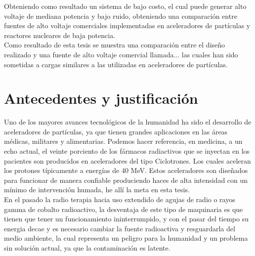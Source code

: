 Obteniendo como resultado un sistema de bajo costo, el cual puede generar alto voltaje de mediana potencia y bajo ruido, obteniendo una comparación entre fuentes de alto voltaje comerciales implementadas en aceleradores de partículas y reactores nucleares de baja potencia. \\

Como resultado de esta tesis se muestra una comparación entre el diseño realizado y una fuente de alto voltaje comercial llamada... las cuales han sido sometidas a cargas similares a las utilizadas en aceleradores de partículas.\newpage




\section{Antecedentes y justificación}


Uno de los mayores avances tecnológicos de la humanidad ha sido el desarrollo de aceleradores de partículas, ya que tienen grandes aplicaciones en las áreas médicas, militares y alimentarias. Podemos hacer referencia, en medicina, a un echo actual, el veinte porciento de los fármacos radiactivos que se inyectan en los pacientes son producidos en aceleradores del tipo Ciclotrones. Los cuales aceleran los protones típicamente a energías de 40 MeV. Estos aceleradores son diseñados para funcionar de manera confiable produciendo haces de alta intensidad con un mínimo de intervención humada, he allí la meta en esta tesis.\\

En el pasado la radio terapia hacia uso extendido de agujas de radio o rayos gamma de cobalto radioactivo, la desventaja de este tipo de maquinaria es que tienen que tener un funcionamiento ininterrumpido, y con el pasar del tiempo su energia decae y es necesario cambiar la fuente radioactiva y resguardarla del medio ambiente, la cual representa un peligro para la humanidad y un problema sin solución actual, ya que la contaminación es latente.\\

